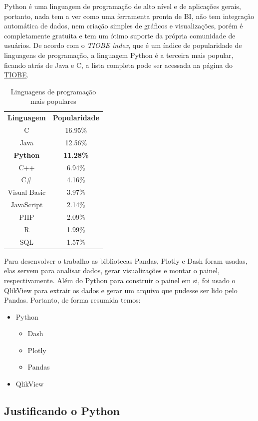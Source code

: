 Python é uma linguagem de programação de alto nível e de aplicações gerais, portanto, nada tem a ver como uma ferramenta pronta de BI, não tem integração automática de dados, nem criação simples de gráficos e visualizações, porém é completamente gratuita e tem um ótimo suporte da própria comunidade de usuários. De acordo com o \textit{TIOBE index}, que é um índice de popularidade de linguagens de programação, a linguagem Python é a terceira mais popular, ficando atrás de Java e C, a lista completa pode ser acessada na página do \href{https://www.tiobe.com/tiobe-index/}{TIOBE}.

\begin{table}[h]
	\centering
	\begin{tabular}{cc}
	\textbf{Linguagem}	& \textbf{Popularidade}  \\
	C	    &  16.95\% \\
	Java	& 12.56\% \\
	\textbf{Python}	& \textbf{11.28\%} \\
	C++	& 6.94\% \\
	C\#	& 4.16\% \\
	Visual Basic & 3.97\% \\
	JavaScript	& 2.14\% \\
	PHP	& 2.09\% \\
	R	& 1.99\% \\
	SQL	& 1.57\%
	\end{tabular}
	\caption{Linguagens de programação mais populares}
	\label{tab:my-table-2}
\end{table}

Para desenvolver o trabalho as bibliotecas Pandas, Plotly e Dash foram usadas, elas servem para analisar dados, gerar visualizações e montar o painel, respectivamente. Além do Python para construir o painel em si, foi usado o QlikView para extrair os dados e gerar um arquivo que pudesse ser lido pelo Pandas. Portanto, de forma resumida temos:

\begin{itemize}
	\item Python
	\begin{itemize}
		\item Dash
		\item Plotly
		\item Pandas
	\end{itemize}
	\item QlikView
\end{itemize}

\subsection{Justificando o Python}

